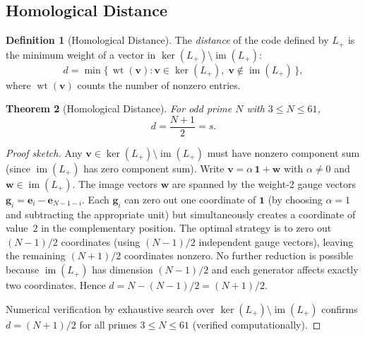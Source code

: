 \documentclass[aip,jmp,reprint,superscriptaddress,floatfix,nofootinbib]{revtex4-2}
\newtheorem{theorem}{Theorem}
\theoremstyle{definition}
\newtheorem{definition}[theorem]{Definition}
\theoremstyle{remark}
\begin{document}
\subsection{Homological Distance}
\label{sec:brst:distance}

\begin{definition}[Homological Distance]\label{def:distance}
The \emph{distance} of the code defined by $L_+$ is the minimum
weight of a vector in $\ker(L_+) \setminus \operatorname{im}(L_+)$:
\begin{equation}\label{eq:distance-def}
d = \min\bigl\{\, \operatorname{wt}(\mathbf{v})
  : \mathbf{v} \in \ker(L_+),\;
    \mathbf{v} \notin \operatorname{im}(L_+) \,\bigr\},
\end{equation}
where $\operatorname{wt}(\mathbf{v})$ counts the number of nonzero
entries.
\end{definition}

\begin{theorem}[Homological Distance]\label{thm:distance}
For odd prime $N$ with $3 \le N \le 61$,
\begin{equation}\label{eq:distance}
d = \frac{N+1}{2} = s.
\end{equation}
\end{theorem}

\begin{proof}[Proof sketch]
Any $\mathbf{v} \in \ker(L_+) \setminus \operatorname{im}(L_+)$
must have nonzero component sum (since $\operatorname{im}(L_+)$ has
zero component sum).  Write $\mathbf{v} = \alpha\,\mathbf{1} +
\mathbf{w}$ with $\alpha \ne 0$ and $\mathbf{w} \in
\operatorname{im}(L_+)$.  The image vectors $\mathbf{w}$ are
spanned by the weight-2 gauge vectors
$\mathbf{g}_i = \mathbf{e}_i - \mathbf{e}_{N-1-i}$.  Each
$\mathbf{g}_i$ can zero out one coordinate of $\mathbf{1}$ (by
choosing $\alpha = 1$ and subtracting the appropriate unit) but
simultaneously creates a coordinate of value~$2$ in the
complementary position.  The optimal strategy is to zero out
$(N{-}1)/2$ coordinates (using $(N{-}1)/2$ independent gauge
vectors), leaving the remaining $(N{+}1)/2$ coordinates nonzero.  No
further reduction is possible because $\operatorname{im}(L_+)$
has dimension $(N{-}1)/2$ and each generator affects exactly two
coordinates.  Hence $d = N - (N{-}1)/2 = (N{+}1)/2$.

Numerical verification by exhaustive search over
$\ker(L_+) \setminus \operatorname{im}(L_+)$ confirms $d = (N{+}1)/2$
for all primes $3 \le N \le 61$ (verified computationally).
\end{proof}
\end{document}
